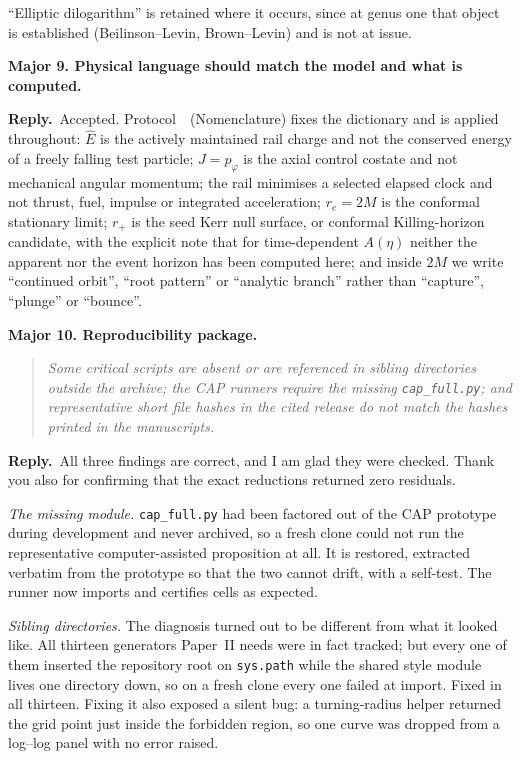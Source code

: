 \documentclass[11pt]{article}
\newenvironment{referee}
  {\begin{quote}\itshape\small}
  {\end{quote}}
\newcommand{\reply}{\par\noindent\textbf{Reply.}\ }
\newcommand{\R}[1]{\par\medskip\noindent\textbf{#1}\par\nopagebreak}
\begin{document}
``Elliptic dilogarithm'' is retained where it occurs, since at genus one that
object is established (Beilinson--Levin, Brown--Levin) and is not at issue.

\R{Major 9. Physical language should match the model and what is computed.}

\reply Accepted. Protocol~\msProtNames\ (Nomenclature) fixes the dictionary and is applied
throughout: $\hat E$ is the actively maintained rail charge and not the conserved
energy of a freely falling test particle; $J=p_\varphi$ is the axial control
costate and not mechanical angular momentum; the rail minimises a selected
elapsed clock and not thrust, fuel, impulse or integrated acceleration; $r_e=2M$
is the conformal stationary limit; $r_+$ is the seed Kerr null surface, or
conformal Killing-horizon candidate, with the explicit note that for
time-dependent $A(\eta)$ neither the apparent nor the event horizon has been
computed here; and inside $2M$ we write ``continued orbit'', ``root pattern'' or
``analytic branch'' rather than ``capture'', ``plunge'' or ``bounce''.

\R{Major 10. Reproducibility package.}

\begin{referee}
Some critical scripts are absent or are referenced in sibling directories outside
the archive; the CAP runners require the missing \texttt{cap\_full.py}; and
representative short file hashes in the cited release do not match the hashes
printed in the manuscripts.
\end{referee}

\reply All three findings are correct, and I am glad they were checked. Thank you
also for confirming that the exact reductions returned zero residuals.

\emph{The missing module.} \texttt{cap\_full.py} had been factored out of the CAP
prototype during development and never archived, so a fresh clone could not run
the representative computer-assisted proposition at all. It is restored,
extracted verbatim from the prototype so that the two cannot drift, with a
self-test. The runner now imports and certifies cells as expected.

\emph{Sibling directories.} The diagnosis turned out to be different from what it
looked like. All thirteen generators Paper~II needs were in fact tracked; but
every one of them inserted the repository root on \texttt{sys.path} while the
shared style module lives one directory down, so on a fresh clone every one
failed at import. Fixed in all thirteen. Fixing it also exposed a silent bug: a
turning-radius helper returned the grid point just inside the forbidden region,
so one curve was dropped from a log--log panel with no error raised.
\end{document}
